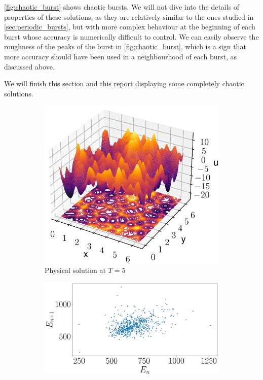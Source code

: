 \documentclass[twoside]{article}
\begin{document}
\cref{fig:chaotic_burst} shows chaotic bursts. We will not dive into the details of properties of these solutions, as they are relatively similar to the ones studied in \cref{sec:periodic_bursts}, but with more complex behaviour at the beginning of each burst whose accuracy is numerically difficult to control. We can easily observe the roughness of the peaks of the burst in \cref{fig:chaotic_burst}, which is a sign that more accuracy should have been used in a neighbourhood of each burst, as discussed above.

We will finish this section and this report displaying some completely chaotic solutions.

\begin{figure}[ht]
  \centering
  \begin{subfigure}[ht]{0.45\textwidth}
    \includegraphics[width=\textwidth]{images/slice_nu1_0.008_nu2_0.008_time_5.0.pdf}
    \caption{Physical solution at $T=5$}
    \label{fig:chaotic_phys}
  \end{subfigure}\hspace{0.033333\textwidth}
  \begin{subfigure}[ht]{0.45\textwidth}
    \includegraphics[width=\textwidth]{images/c_return.pdf}

\end{subfigure}
\end{figure}
\end{document}
